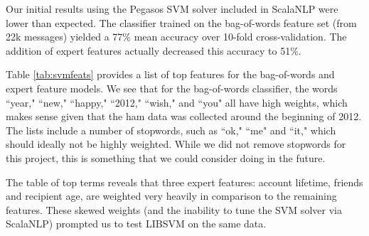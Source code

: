 \documentclass[preprint]{acm_proc_article-sp}
\begin{document}
Our initial results using the Pegasos SVM solver included in ScalaNLP were lower than expected. The 
classifier trained on the bag-of-words feature set (from 22k messages) yielded a 77\% mean accuracy 
over 10-fold cross-validation. The addition of expert features actually decreased this accuracy to 
51\%. 

Table \ref{tab:svmfeats} provides a list of top features for the bag-of-words and expert 
feature models. We see that for the bag-of-words classifier, the words ``year," ``new," ``happy,"  
``2012," ``wish," and ``you" all have high weights, which makes sense given that the ham data was 
collected around the beginning of 2012. The lists include a number of stopwords, such as ``ok," 
``me" and ``it," which should ideally not be highly weighted. While we did not remove stopwords for this 
project, this is something that we could consider doing in the future. 

The table of top terms reveals that three expert features: account lifetime, friends and 
recipient age, are weighted very heavily in comparison to the remaining features. These 
skewed weights (and the inability to tune the SVM solver via ScalaNLP) prompted us to test LIBSVM 
on the same data.
\end{document}
